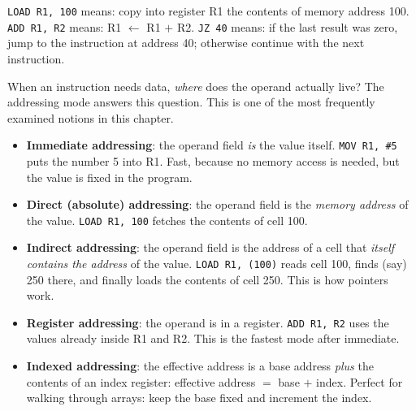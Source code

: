\documentclass[11pt]{article}
\newcommand{\cle}[1]{{\popxbold\color{popdark}#1}}
\newcounter{popsec}
\newcounter{popsub}
\newcommand{\courssub}[1]{%
  \stepcounter{popsub}%
  \par\vspace{9pt}\noindent{\popxbold\fontsize{11.5}{13}\selectfont\color{popink}{\color{poporange}\thepopsec.\thepopsub}\hspace{6pt}#1}\par\nopagebreak\vspace{4pt}
}
\begin{document}
\begin{exemplebox}
\texttt{LOAD R1, 100} means: copy into register R1 the contents of memory address 100. \texttt{ADD R1, R2} means: R1 $\leftarrow$ R1 $+$ R2. \texttt{JZ 40} means: if the last result was zero, jump to the instruction at address 40; otherwise continue with the next instruction.
\end{exemplebox}

\courssub{Addressing Modes}

When an instruction needs data, \emph{where} does the operand actually live? The \cle{addressing mode} answers this question. This is one of the most frequently examined notions in this chapter.

\begin{itemize}
\item \textbf{Immediate addressing}: the operand field \emph{is} the value itself. \texttt{MOV R1, \#5} puts the number 5 into R1. Fast, because no memory access is needed, but the value is fixed in the program.
\item \textbf{Direct (absolute) addressing}: the operand field is the \emph{memory address} of the value. \texttt{LOAD R1, 100} fetches the contents of cell 100.
\item \textbf{Indirect addressing}: the operand field is the address of a cell that \emph{itself contains the address} of the value. \texttt{LOAD R1, (100)} reads cell 100, finds (say) 250 there, and finally loads the contents of cell 250. This is how pointers work.
\item \textbf{Register addressing}: the operand is in a register. \texttt{ADD R1, R2} uses the values already inside R1 and R2. This is the fastest mode after immediate.
\item \textbf{Indexed addressing}: the effective address is a base address \emph{plus} the contents of an index register: effective address $=$ base $+$ index. Perfect for walking through arrays: keep the base fixed and increment the index.
\end{itemize}
\end{document}

